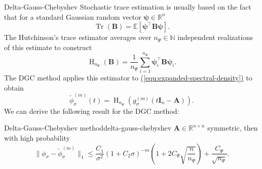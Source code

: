 \documentclass[final, leqno, 12pt]{beamer}
\newcommand{\mtx}[1]{\boldsymbol{#1}}
\newcommand{\vct}[1]{\boldsymbol{#1}}
\DeclareMathOperator{\Tr}{Tr}
\DeclareMathOperator{\Hutch}{H}
\newcommand{\refequ}[1]{\hyperref[#1]{\textcolor{linkcolor}{(\ref*{#1})}}}
\let\oldcite\cite
\renewcommand{\cite}[2][]{\textcolor{linkcolor}{\oldcite{#2}}}
\begin{document}
\begin{frame}[t]

\vspace{15pt}
\begin{columns}[t]

    \begin{column}{0.3\paperwidth}

        \begin{block}{Delta-Gauss-Chebyshev}
            Stochastic trace estimation is usually based on the fact that
            for a standard Gaussian random vector $\vct{\psi} \in \mathbb{R}^n$
            \begin{equation}
                \Tr(\mtx{B}) = \mathbb{E}\left[\vct{\psi}^{\top} \mtx{B} \vct{\psi}\right].
            \end{equation}
            The Hutchinson's trace estimator averages over $n_{\Psi} \in \mathbb{N}$
            independent realizations of this estimate to construct
            \begin{equation}
                \Hutch_{n_{\Psi}}(\mtx{B}) = \frac{1}{n_{\Psi}} \sum_{i=1}^{n_{\Psi}} \vct{\psi}_i^{\top} \mtx{B} \vct{\psi}_i.
            \end{equation}
            The \gls{DGC} method \cite{lin2017randomized} applies this
            estimator to \refequ{equ:expanded-spectral-density} to obtain
            \begin{equation}
                \boxed{\widetilde{\phi}_{\sigma}^{(m)}(t) = \Hutch_{n_{\Psi}}(g_{\sigma}^{(m)}(t\mtx{I}_n - \mtx{A})).}
            \end{equation}
            We can derive the following result for the \gls{DGC} method:
            \begin{thm}{Delta-Gauss-Chebyshev method}{delta-gauss-chebyshev}
                $\mtx{A} \in \mathbb{R}^{n \times n}$ symmetric, then with high probability
                \begin{equation*}
                    \lVert \phi_{\sigma} - \widetilde{\phi}_{\sigma}^{(m)}\rVert _1
                    \leq \frac{C_1}{\sigma^2} (1 + C_2 \sigma)^{-m} \left( 1 + 2 C_{\Psi} \sqrt{\frac{n}{n_{\Psi}}} \right) + \frac{C_{\Psi}}{\sqrt{n_{\Psi}}}.
                \end{equation*}
            \end{thm}
        \end{block}


\end{column}
\end{columns}
\end{frame}
\end{document}
